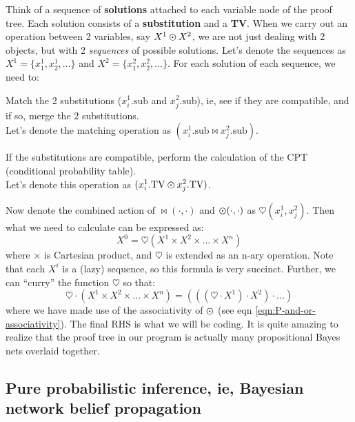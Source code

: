 Think of a sequence of \textbf{solutions} attached to each variable node of the proof tree.  Each solution consists of a \textbf{substitution} and a \textbf{TV}.  When we carry out an operation between 2 variables, say $X^1 \varodot X^2$, we are not just dealing with 2 objects, but with 2 \textit{sequences} of possible solutions.  Let's denote the sequences as $X^1 = \{ x^1_1, x^1_2, ... \} $ and $X^2 = \{ x^2_1, x^2_2, ... \}$.  For each solution of each sequence, we need to:
\begin{compactenum}[1.]
\item  Match the 2 substitutions ($x^1_i.\mbox{sub}$ and $x^2_j.\mbox{sub}$), ie, see if they are compatible, and if so, merge the 2 substitutions.\\
       Let's denote the matching operation as $(x^1_i.\mbox{sub} \bowtie x^2_j.\mbox{sub})$.
\item  If the substitutions are compatible, perform the calculation of the CPT (conditional probability table).\\
       Let's denote this operation as $(x^1_i.\mbox{TV} \varodot x^2_j.\mbox{TV})$.
\end{compactenum}
Now denote the combined action of $\bowtie(\cdot, \cdot)$ and $\varodot(\cdot, \cdot)$ as $\heartsuit(x^1_i, x^2_j)$.  Then what we need to calculate can be expressed as:
\begin{equation}
X^0 = \heartsuit( X^1 \times X^2 \times ... \times X^n)
\end{equation}
where $\times$ is Cartesian product, and $\heartsuit$ is extended as an n-ary operation.  Note that each $X^i$ is a (lazy) sequence, so this formula is very succinct.  Further, we can ``curry'' the function $\heartsuit$ so that:
\begin{equation}
\heartsuit \cdot ( X^1 \times X^2 \times ... \times X^n) = (((\heartsuit \cdot X^1) \cdot X^2) \cdot ... )
\end{equation}
where we have made use of the associativity of $\varodot$ (see eqn \ref{eqn:P-and-or-associativity}).  The final RHS is what we will be coding.  It is quite amazing to realize that the proof tree in our program is actually many propositional Bayes nets overlaid together.

\subsection{Pure probabilistic inference, ie, Bayesian network belief propagation}
\label{sec:P-inference}

